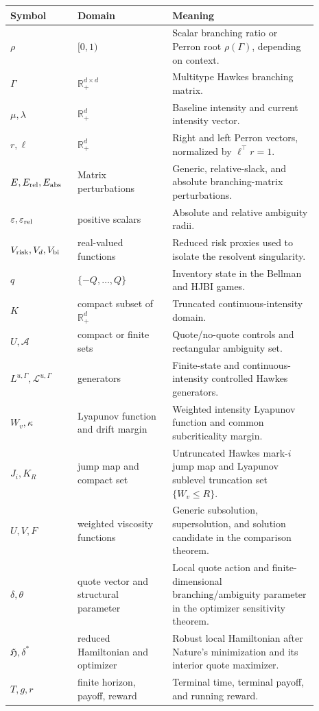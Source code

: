 \documentclass[11pt]{article}
\newcommand{\R}{\mathbb{R}}
\newcommand{\eps}{\varepsilon}
\begin{document}
\begin{center}
\small
\begin{tabular}{>{\raggedright\arraybackslash}p{0.18\linewidth}>{\raggedright\arraybackslash}p{0.28\linewidth}>{\raggedright\arraybackslash}p{0.43\linewidth}}
\hline
Symbol & Domain & Meaning \\
\hline
$\rho$ & $[0,1)$ & Scalar branching ratio or Perron root
$\rho(\Gamma)$, depending on context. \\
$\Gamma$ & $\R_+^{d\times d}$ & Multitype Hawkes branching matrix. \\
$\mu,\lambda$ & $\R_+^d$ & Baseline intensity and current intensity vector. \\
$r,\ell$ & $\R_+^d$ & Right and left Perron vectors, normalized by
$\ell^\top r=1$. \\
$E,E_{\rm rel},E_{\rm abs}$ & Matrix perturbations & Generic, relative-slack,
and absolute branching-matrix perturbations. \\
$\eps,\eps_{\rm rel}$ & positive scalars & Absolute and relative ambiguity
radii. \\
$V_{\rm risk},V_d,V_{\rm bi}$ & real-valued functions & Reduced risk proxies
used to isolate the resolvent singularity. \\
$q$ & $\{-Q,\ldots,Q\}$ & Inventory state in the Bellman and HJBI games. \\
$K$ & compact subset of $\R_+^d$ & Truncated continuous-intensity domain. \\
$U,\mathcal A$ & compact or finite sets & Quote/no-quote controls and
rectangular ambiguity set. \\
$L^{u,\Gamma},\mathcal L^{u,\Gamma}$ & generators & Finite-state and
continuous-intensity controlled Hawkes generators. \\
$W_v,\kappa$ & Lyapunov function and drift margin & Weighted intensity
Lyapunov function and common subcriticality margin. \\
$J_i,K_R$ & jump map and compact set & Untruncated Hawkes mark-$i$ jump map
and Lyapunov sublevel truncation set $\{W_v\le R\}$. \\
$U,V,F$ & weighted viscosity functions & Generic subsolution, supersolution,
and solution candidate in the comparison theorem. \\
$\delta,\theta$ & quote vector and structural parameter & Local quote action
and finite-dimensional branching/ambiguity parameter in the optimizer
sensitivity theorem. \\
$\mathfrak H,\delta^*$ & reduced Hamiltonian and optimizer & Robust local
Hamiltonian after Nature's minimization and its interior quote maximizer. \\
$T,g,r$ & finite horizon, payoff, reward & Terminal time, terminal payoff, and
running reward. \\
\hline
\end{tabular}
\end{center}
\end{document}
